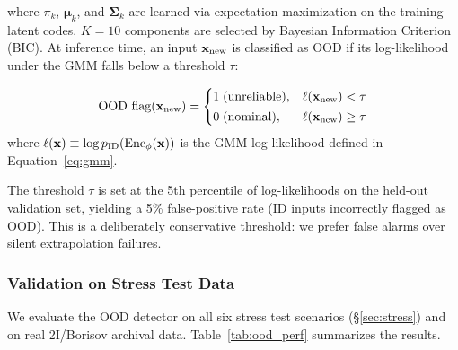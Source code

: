 \documentclass[preprint2]{aastex631}
\begin{document}
where $\pi_k$, $\boldsymbol{\mu}_k$, and $\boldsymbol{\Sigma}_k$ are learned via expectation-maximization on the training latent codes. $K=10$ components are selected by Bayesian Information Criterion (BIC). At inference time, an input $\mathbf{x}_{\rm new}$ is classified as OOD if its log-likelihood under the GMM falls below a threshold $\tau$:

\begin{equation}\label{eq:ood_flag}
\text{OOD flag}(\mathbf{x}_{\rm new}) =
\begin{cases}
1 \; \text{(unreliable)}, & \ell(\mathbf{x}_{\rm new}) < \tau \\[2pt]
0 \; \text{(nominal)},   & \ell(\mathbf{x}_{\rm new}) \geq \tau
\end{cases}
\end{equation}
where $\ell(\mathbf{x}) \equiv \log p_{\rm ID}(\text{Enc}_\phi(\mathbf{x}))$ is the GMM log-likelihood defined in Equation~\ref{eq:gmm}.

The threshold $\tau$ is set at the 5th percentile of log-likelihoods on the held-out validation set, yielding a 5\% false-positive rate (ID inputs incorrectly flagged as OOD). This is a deliberately conservative threshold: we prefer false alarms over silent extrapolation failures.

\subsubsection{Validation on Stress Test Data}

We evaluate the OOD detector on all six stress test scenarios (\S\ref{sec:stress}) and on real 2I/Borisov archival data. Table~\ref{tab:ood_perf} summarizes the results.
\end{document}
